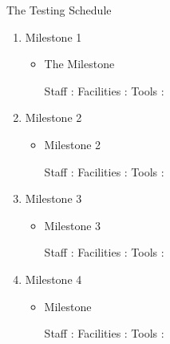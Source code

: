 






\centerline{ The Testing Schedule}

\begin{enumerate}
   \item Milestone 1  
   \begin{itemize}
     \item The Milestone

     Staff :
     Facilities :
     Tools :

   \end{itemize}
  
  \item Milestone 2 
   \begin{itemize}
     \item Milestone 2

     Staff :
     Facilities :
     Tools :

   \end{itemize}

     \item Milestone 3
   \begin{itemize}
     \item Milestone 3

     Staff :
     Facilities :
     Tools :
   \end{itemize}



 \item Milestone 4
   \begin{itemize}
 	\item Milestone 
 	
 	 Staff :
     Facilities :
     Tools :
 	 \end{itemize}
 	 \end{enumerate}
